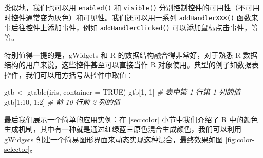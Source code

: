 \documentclass[
  b5paper,
  UTF8,twoside]{book}
\newenvironment{Shaded}{\begin{snugshade}}{\end{snugshade}}
\newcommand{\AttributeTok}[1]{\textcolor[rgb]{0.77,0.63,0.00}{#1}}
\newcommand{\CommentTok}[1]{\textcolor[rgb]{0.56,0.35,0.01}{\textit{#1}}}
\newcommand{\ConstantTok}[1]{\textcolor[rgb]{0.00,0.00,0.00}{#1}}
\newcommand{\ControlFlowTok}[1]{\textcolor[rgb]{0.13,0.29,0.53}{\textbf{#1}}}
\newcommand{\DecValTok}[1]{\textcolor[rgb]{0.00,0.00,0.81}{#1}}
\newcommand{\FloatTok}[1]{\textcolor[rgb]{0.00,0.00,0.81}{#1}}
\newcommand{\FunctionTok}[1]{\textcolor[rgb]{0.00,0.00,0.00}{#1}}
\newcommand{\NormalTok}[1]{#1}
\newcommand{\OtherTok}[1]{\textcolor[rgb]{0.56,0.35,0.01}{#1}}
\newcommand{\SpecialCharTok}[1]{\textcolor[rgb]{0.00,0.00,0.00}{#1}}
\newcommand{\StringTok}[1]{\textcolor[rgb]{0.31,0.60,0.02}{#1}}
\begin{document}
类似地，我们也可以用 \texttt{enabled()} 和 \texttt{visible()} 分别控制控件的可用性（不可用时控件通常变为灰色）和可见性。我们还可以用一系列 \texttt{addHandlerXXX()} 函数来事后往控件上添加事件，例如 \texttt{addHandlerClicked()} 可以添加鼠标点击事件，等等。

特别值得一提的是，gWidgets 和 R 的数据结构融合得非常好，对于熟悉 R 数据结构的用户来说，这些控件甚至可以直接当作 R 对象使用。典型的例子如数据表控件，我们可以用方括号从控件中取值：

\begin{Shaded}
\begin{Highlighting}[]
\NormalTok{gtb }\OtherTok{\textless{}{-}} \FunctionTok{gtable}\NormalTok{(iris, }\AttributeTok{container =} \ConstantTok{TRUE}\NormalTok{)}
\NormalTok{gtb[}\DecValTok{1}\NormalTok{, }\DecValTok{1}\NormalTok{] }\CommentTok{\# 表中第 1 行第 1 列的值}
\NormalTok{gtb[}\DecValTok{1}\SpecialCharTok{:}\DecValTok{10}\NormalTok{, }\DecValTok{1}\SpecialCharTok{:}\DecValTok{2}\NormalTok{] }\CommentTok{\# 前 10 行前 2 列的值}
\end{Highlighting}
\end{Shaded}

最后我们展示一个简单的应用实例：在 \ref{sec:color} 小节中我们介绍了 R 中的颜色生成机制，其中有一种就是通过红绿蓝三原色混合生成颜色，我们可以利用 gWidgets 创建一个简易图形界面来动态实现这种混合，最终效果如图 \ref{fig:color-selector}。

\begin{Shaded}
\end{Shaded}
\end{document}
